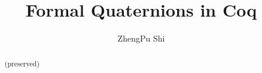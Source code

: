 \documentclass[runningheads,a4paper,english]{llncs}[2022/01/12]
\begin{document}
%
\title{Formal Quaternions in Coq
}
%
%
\author{ZhengPu Shi
}
%
%

%
\maketitle              %
%
\begin{abstract}
  (preserved)
\end{abstract}
%
%
%


\end{document}
